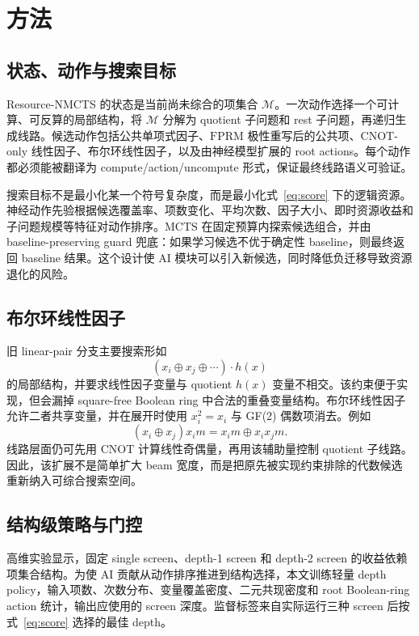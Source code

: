 \documentclass[UTF8,fontset=macnew,11pt]{ctexart}
\newcommand{\method}{Resource-NMCTS}
\newcommand{\fprm}{\ensuremath{\mathrm{FPRM}}}
\newcommand{\mcts}{\ensuremath{\mathrm{MCTS}}}
\newcommand{\xor}{\ensuremath{\oplus}}
\begin{document}
\section{方法}

\subsection{状态、动作与搜索目标}

\method{} 的状态是当前尚未综合的项集合 $\mathcal{M}$。一次动作选择一个可计算、可反算的局部结构，将 $\mathcal{M}$ 分解为 quotient 子问题和 rest 子问题，再递归生成线路。候选动作包括公共单项式因子、\fprm{} 极性重写后的公共项、CNOT-only 线性因子、布尔环线性因子，以及由神经模型扩展的 root actions。每个动作都必须能被翻译为 compute/action/uncompute 形式，保证最终线路语义可验证。

搜索目标不是最小化某一个符号复杂度，而是最小化式~\eqref{eq:score} 下的逻辑资源。神经动作先验根据候选覆盖率、项数变化、平均次数、因子大小、即时资源收益和子问题规模等特征对动作排序。\mcts{} 在固定预算内探索候选组合，并由 baseline-preserving guard 兜底：如果学习候选不优于确定性 baseline，则最终返回 baseline 结果。这个设计使 AI 模块可以引入新候选，同时降低负迁移导致资源退化的风险。

\subsection{布尔环线性因子}

旧 linear-pair 分支主要搜索形如
\begin{equation}
  (x_i\xor x_j\xor\cdots)\cdot h(x)
  \label{eq:linear_factor}
\end{equation}
的局部结构，并要求线性因子变量与 quotient $h(x)$ 变量不相交。该约束便于实现，但会漏掉 square-free Boolean ring 中合法的重叠变量结构。布尔环线性因子允许二者共享变量，并在展开时使用 $x_i^2=x_i$ 与 GF(2) 偶数项消去。例如
\begin{equation}
  (x_i\xor x_j)x_i m = x_i m \xor x_i x_j m .
  \label{eq:boolean_ring}
\end{equation}
线路层面仍可先用 CNOT 计算线性奇偶量，再用该辅助量控制 quotient 子线路。因此，该扩展不是简单扩大 beam 宽度，而是把原先被实现约束排除的代数候选重新纳入可综合搜索空间。

\subsection{结构级策略与门控}

高维实验显示，固定 single screen、depth-1 screen 和 depth-2 screen 的收益依赖项集合结构。为使 AI 贡献从动作排序推进到结构选择，本文训练轻量 depth policy，输入项数、次数分布、变量覆盖密度、二元共现密度和 root Boolean-ring action 统计，输出应使用的 screen 深度。监督标签来自实际运行三种 screen 后按式~\eqref{eq:score} 选择的最佳 depth。
\end{document}
